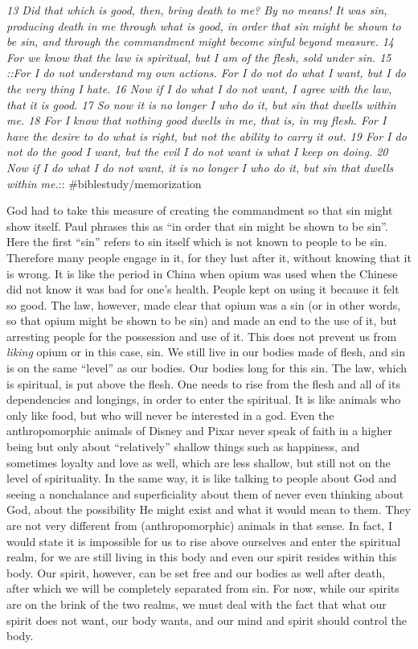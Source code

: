 \emph{13 Did that which is good, then, bring death to me? By no means!
It was sin, producing death in me through what is good, in order that
sin might be shown to be sin, and through the commandment might become
sinful beyond measure. 14 For we know that the law is spiritual, but I
am of the flesh, sold under sin. 15 ::For I do not understand my own
actions. For I do not do what I want, but I do the very thing I hate. 16
Now if I do what I do not want, I agree with the law, that it is good.
17 So now it is no longer I who do it, but sin that dwells within me. 18
For I know that nothing good dwells in me, that is, in my flesh. For I
have the desire to do what is right, but not the ability to carry it
out. 19 For I do not do the good I want, but the evil I do not want is
what I keep on doing. 20 Now if I do what I do not want, it is no longer
I who do it, but sin that dwells within me.}:: \#biblestudy/memorization

God had to take this measure of creating the commandment so that sin
might show itself. Paul phrases this as ``in order that sin might be
shown to be sin''. Here the first ``sin'' refers to sin itself which is
not known to people to be sin. Therefore many people engage in it, for
they lust after it, without knowing that it is wrong. It is like the
period in China when opium was used when the Chinese did not know it was
bad for one's health. People kept on using it because it felt so good.
The law, however, made clear that opium was a sin (or in other words, so
that opium might be shown to be sin) and made an end to the use of it,
but arresting people for the possession and use of it. This does not
prevent us from \emph{liking} opium or in this case, sin. We still live
in our bodies made of flesh, and sin is on the same ``level'' as our
bodies. Our bodies long for this sin. The law, which is spiritual, is
put above the flesh. One needs to rise from the flesh and all of its
dependencies and longings, in order to enter the spiritual. It is like
animals who only like food, but who will never be interested in a god.
Even the anthropomorphic animals of Disney and Pixar never speak of
faith in a higher being but only about ``relatively'' shallow things
such as happiness, and sometimes loyalty and love as well, which are
less shallow, but still not on the level of spirituality. In the same
way, it is like talking to people about God and seeing a nonchalance and
superficiality about them of never even thinking about God, about the
possibility He might exist and what it would mean to them. They are not
very different from (anthropomorphic) animals in that sense. In fact, I
would state it is impossible for us to rise above ourselves and enter
the spiritual realm, for we are still living in this body and even our
spirit resides within this body. Our spirit, however, can be set free
and our bodies as well after death, after which we will be completely
separated from sin. For now, while our spirits are on the brink of the
two realms, we must deal with the fact that what our spirit does not
want, our body wants, and our mind and spirit should control the body.

